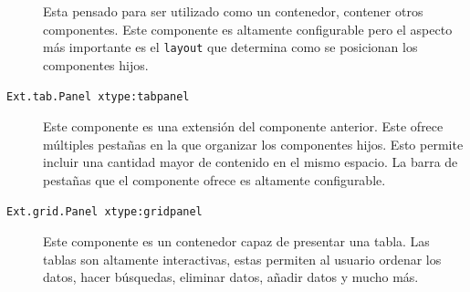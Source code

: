 \begin{description}
			  Esta pensado para ser utilizado como un contenedor, contener otros componentes. Este componente es altamente configurable
			  pero el aspecto más importante es el \texttt{layout} que determina como se posicionan los componentes hijos. 
			\item[\texttt{Ext.tab.Panel xtype:tabpanel}] Este componente es una extensión del componente anterior. Este ofrece múltiples
			  pestañas en la que organizar los componentes hijos.  Esto permite incluir una cantidad mayor de contenido en el mismo
			  espacio. La barra de pestañas que el componente ofrece es altamente configurable. 
			\item[\texttt{Ext.grid.Panel xtype:gridpanel}] Este componente es un contenedor capaz de presentar una tabla. Las tablas son
			  altamente interactivas, estas permiten al usuario ordenar los datos, hacer búsquedas, eliminar datos, añadir datos y mucho
			  más.
		\end{description}
